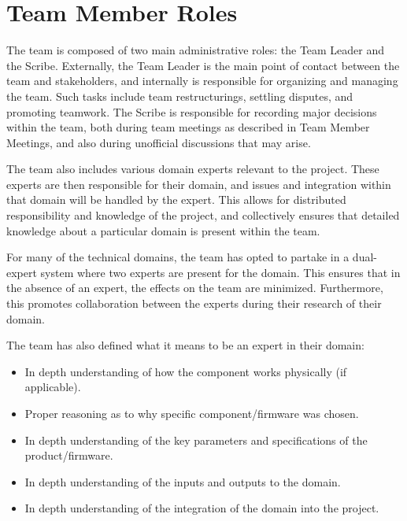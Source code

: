 \documentclass{article}
\begin{document}
\section{Team Member Roles}

The team is composed of two main administrative roles: the Team Leader and the Scribe. Externally, the Team Leader is the main point of contact between the team and stakeholders, and internally is responsible for organizing and managing the team. Such tasks include team restructurings, settling disputes, and promoting teamwork. The Scribe is responsible for recording major decisions within the team, both during team meetings as described in Team Member Meetings, and also during unofficial discussions that may arise.  

The team also includes various domain experts relevant to the project. These experts are then responsible for their domain, and issues and integration within that domain will be handled by the expert. This allows for distributed responsibility and knowledge of the project, and collectively ensures that detailed knowledge about a particular domain is present within the team. 

For many of the technical domains, the team has opted to partake in a dual-expert system where two experts are present for the domain. This ensures that in the absence of an expert, the effects on the team are minimized. Furthermore, this promotes collaboration between the experts during their research of their domain. 

The team has also defined what it means to be an expert in their domain: 
\begin{itemize}
    \item In depth understanding of how the component works physically (if applicable). 
    \item Proper reasoning as to why specific component/firmware was chosen.
    \item In depth understanding of the key parameters and specifications of the product/firmware.
    \item In depth understanding of the inputs and outputs to the domain. 
    \item In depth understanding of the integration of the domain into the project. 
\end{itemize}
\end{document}
